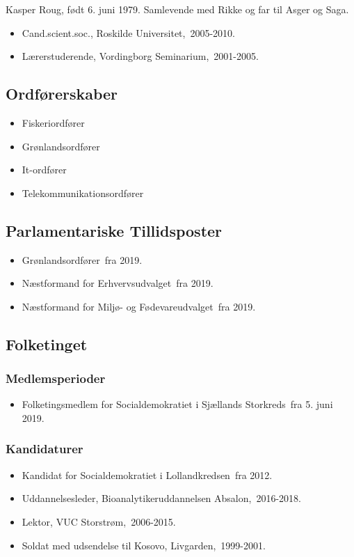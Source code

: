 \documentclass[11pt, a4paper]{awesome-cv}
\begin{document}
\makecvheader[R]
\makelettertitle
\begin{cvletter}
Kasper Roug, født 6. juni 1979. Samlevende med Rikke og far til Asger og Saga.

\begin{itemize}
\item Cand.scient.soc., Roskilde Universitet, 2005-2010.
\item Lærerstuderende, Vordingborg Seminarium, 2001-2005.
\end{itemize}
\subsection*{Ordførerskaber}
\begin{itemize}
\item Fiskeriordfører
\item Grønlandsordfører
\item It-ordfører
\item Telekommunikationsordfører
\end{itemize}
\subsection*{Parlamentariske Tillidsposter}
\begin{itemize}
\item Grønlandsordfører fra 2019.
\item Næstformand for Erhvervsudvalget fra 2019.
\item Næstformand for Miljø- og Fødevareudvalget fra 2019.
\end{itemize}
\subsection*{Folketinget}
\subsubsection*{Medlemsperioder}
\begin{itemize}
\item Folketingsmedlem for Socialdemokratiet i Sjællands Storkreds fra 5. juni 2019.
\end{itemize}
\subsubsection*{Kandidaturer}
\begin{itemize}
\item Kandidat for Socialdemokratiet i Lollandkredsen fra 2012.
\end{itemize}
\begin{itemize}
\item Uddannelsesleder, Bioanalytikeruddannelsen Absalon, 2016-2018.
\item Lektor, VUC Storstrøm, 2006-2015.
\item Soldat med udsendelse til Kosovo, Livgarden, 1999-2001.
\end{itemize}
\end{cvletter}
\end{document}
